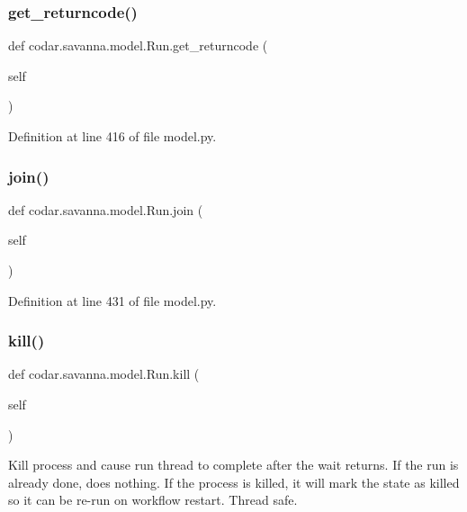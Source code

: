 \subsubsection{\texorpdfstring{get\+\_\+returncode()}{get\_returncode()}}
{\footnotesize\ttfamily def codar.\+savanna.\+model.\+Run.\+get\+\_\+returncode (\begin{DoxyParamCaption}\item[{}]{self }\end{DoxyParamCaption})}



Definition at line 416 of file model.\+py.

\mbox{\label{classcodar_1_1savanna_1_1model_1_1_run_a9f413d6685194f969cc686f6e829d8a9}} 
\subsubsection{\texorpdfstring{join()}{join()}}
{\footnotesize\ttfamily def codar.\+savanna.\+model.\+Run.\+join (\begin{DoxyParamCaption}\item[{}]{self }\end{DoxyParamCaption})}



Definition at line 431 of file model.\+py.

\mbox{\label{classcodar_1_1savanna_1_1model_1_1_run_a734d77c85281aa6b2d76ec798575c52b}} 
\subsubsection{\texorpdfstring{kill()}{kill()}}
{\footnotesize\ttfamily def codar.\+savanna.\+model.\+Run.\+kill (\begin{DoxyParamCaption}\item[{}]{self }\end{DoxyParamCaption})}

\begin{DoxyVerb}Kill process and cause run thread to complete after the wait
returns. If the run is already done, does nothing. If the process is
killed, it will mark the state as killed so it can be re-run on
workflow restart. Thread safe.\end{DoxyVerb}
 

